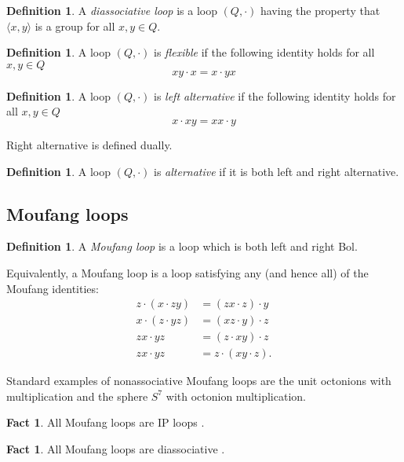\documentclass[12pt, twoside, openright]{report}
\theoremstyle{definition}
\newtheorem{fct}[thm]{Fact}
\newtheorem{dfn}[thm]{Definition}
\begin{document}
\begin{dfn}
  A \emph{diassociative loop} is a loop $(Q, \cdot)$ having the property that $\langle x, y\rangle$ is a group
    for all $x, y\in Q$.
\end{dfn}

\begin{dfn}
  A loop $(Q, \cdot)$ is \emph{flexible} if the following identity holds for all $x, y\in Q$
  \[xy\cdot x = x\cdot yx\]
\end{dfn}

\begin{dfn}
  A loop $(Q, \cdot)$ is \emph{left alternative} if the following identity holds for all $x, y\in Q$
  \[x\cdot xy = xx\cdot y\]
\end{dfn}

Right alternative is defined dually.

\begin{dfn}
  A loop $(Q, \cdot)$ is \emph{alternative} if it is both left and right alternative.
\end{dfn}

\subsection{Moufang loops}

\begin{dfn}
  A \emph{Moufang loop} is a loop which is both left and right Bol.
\end{dfn}

Equivalently, a Moufang loop is a loop satisfying any (and hence all) of the Moufang identities:
  \begin{align*}
    z\cdot(x \cdot zy) &= (zx\cdot z)\cdot y\\
    x\cdot(z \cdot yz) &= (xz\cdot y)\cdot z\\
    zx\cdot yz &= (z\cdot xy)\cdot z\\
    zx\cdot yz &= z\cdot(xy\cdot z).
  \end{align*}

Standard examples of nonassociative Moufang loops are the unit octonions with multiplication and the sphere
  $S^7$ with octonion multiplication.

\begin{fct}
  All Moufang loops are IP loops \cite{Moufang}.
\end{fct}

\begin{fct}
  All Moufang loops are diassociative \cite{Moufang}.
\end{fct}
\end{document}
